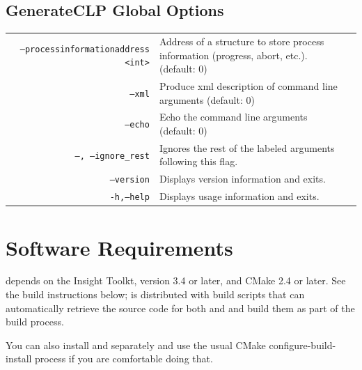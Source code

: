 \documentclass{InsightArticle}
\begin{document}
\subsection{GenerateCLP Global Options}
\begin{tabular}{rp{0.15in}l}
\vspace{0.15in}\par
\texttt{--processinformationaddress <int>} & \parbox[t]{3.5in}{Address of a structure to store process information (progress, abort,  etc.). (default: 0)} \\
\vspace{0.15in}\par
\texttt{--xml} & \parbox[t]{3.5in}{Produce xml description of command line arguments (default: 0)} \\
\vspace{0.15in}\par
\texttt{--echo} & \parbox[t]{3.5in}{Echo the command line arguments (default: 0)} \\
\vspace{0.15in}\par

\texttt{--, --ignore\_rest} & \parbox[t]{3.5in}{ Ignores the rest of the labeled arguments following this flag.} \\
\vspace{0.15in}\par
\texttt{--version} & \parbox[t]{3.5in}{Displays version information and exits.} \\
\vspace{0.15in}\par
\texttt{-h,--help} & \parbox[t]{3.5in}{Displays usage information and exits.}
\end{tabular}

\section{Software Requirements}

\miregprog{} depends on the Insight Toolkt, version 3.4 or later, and
CMake 2.4 or later. See the build instructions below; \miregprog{} is
distributed with build scripts that can automatically retrieve the
source code for both  and  and build them as
part of the \miregprog{} build process.  

You can also install  and  separately and use
the usual CMake configure-build-install process if you are comfortable
doing that.
\end{document}
